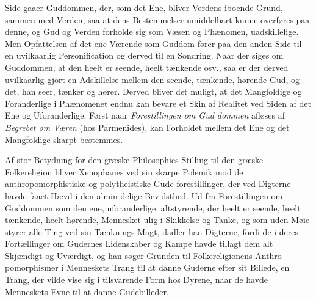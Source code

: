 \documentclass[12pt,a4paper]{book}
\begin{document}
%
%
Side gaaer Guddommen, der, som det Ene, bliver Verdens
iboende Grund, sammen med Verden, saa at dens Bestemmelser
umiddelbart kunne overføres paa denne, og Gud og Verden
forholde sig som Væsen og Phænomen, uadskillelige. Men
Opfattelsen af det ene Værende som Guddom fører paa den
anden Side til en uvilkaarlig Personification og derved til en
Sondring. Naar der siges om Guddommen, at den heelt er
seende, heelt tænkende osv., saa er der derved uvilkaarlig
gjort en Adskillelse mellem den seende, tænkende, hørende
Gud, og det, han seer, tænker og hører. Derved bliver det
muligt, at det Mangfoldige og Foranderlige i Phænomenet
endnu kan bevare et Skin af Realitet ved Siden af det Ene
og Uforanderlige. Først naar \emph{Forestillingen om Gud\-%
dommen} afløses af \emph{Begrebet om Væren} (hos Parmenides),
kan Forholdet mellem det Ene og det Mangfoldige skarpt
bestemmes.

Af stor Betydning for den græske Philosophies Stilling til
den græske Folkereligion bliver Xenophanes ved sin skarpe
Polemik mod de anthropomorphistiske og polytheistiske Gude\-%
forestillinger, der ved Digterne havde faaet Hævd i den almin\-%
delige Bevidsthed. Ud fra Forestillingen om Guddommen som
den ene, uforanderlige, altstyrende, der heelt er seende, heelt
tænkende, heelt hørende, Mennesket ulig i Skikkelse og Tanke,
og som uden Møie styrer alle Ting ved sin Tænknings Magt,
dadler han Digterne, fordi de i deres Fortællinger om Gudernes
Lidenskaber og Kampe havde tillagt dem alt Skjændigt og
Uværdigt, og han søger Grunden til Folkereligionens Anthro\-%
pomorphismer i Menneskets Trang til at danne Guderne efter
sit Billede, en Trang, der vilde vise sig i tilsvarende Form hos
Dyrene, naar de havde Menneskets Evne til at danne Gudebilleder.
\end{document}

